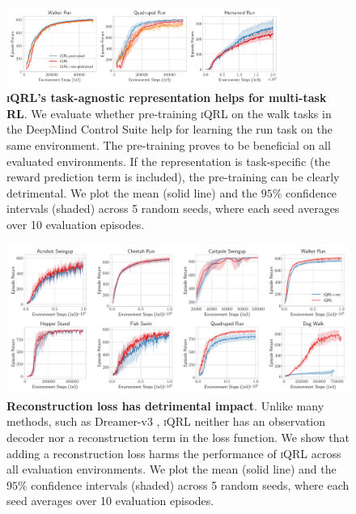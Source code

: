 \documentclass{article}
\theoremstyle{plain}
\theoremstyle{definition}
\theoremstyle{remark}
\newcommand{\our}{\textsc{iQRL}\xspace}
\begin{document}
\begin{figure}[ht]
	\vskip 0.2in
	\begin{center}
		\centerline{\includegraphics[width=0.8\textwidth]{./figs/task-agnostic-ablation.pdf}}
		\caption{\textbf{\our's task-agnostic representation helps for multi-task RL}. We evaluate whether pre-training \our on the walk tasks in the DeepMind Control Suite help for learning the run task on the same environment. The pre-training proves to be beneficial on all evaluated environments. If the representation is task-specific (the reward prediction term is included), the pre-training can be clearly detrimental. We plot the mean (solid line) and the $95\%$ confidence intervals (shaded) across 5 random seeds, where each seed averages over 10 evaluation episodes.}
		\label{fig:multi-task-pretraining}
	\end{center}
	\vskip -0.2in
\end{figure}


\begin{figure}[ht]
	\vskip 0.2in
	\begin{center}
		\centerline{\includegraphics[width=1.0\textwidth]{./figs/reconstruction-loss-ablation.pdf}}
		\caption{\textbf{Reconstruction loss has detrimental impact}. Unlike many methods, such as Dreamer-v3 \cite{hafner2023mastering}, \our neither has an observation decoder nor a reconstruction term in the loss function. We show that adding a reconstruction loss harms the performance of \our across all evaluation environments. We plot the mean (solid line) and the $95\%$ confidence intervals (shaded) across 5 random seeds, where each seed averages over 10 evaluation episodes.}
		\label{fig:reconstruction-loss-ablation}
	\end{center}
	\vskip -0.2in
\end{figure}
\end{document}
